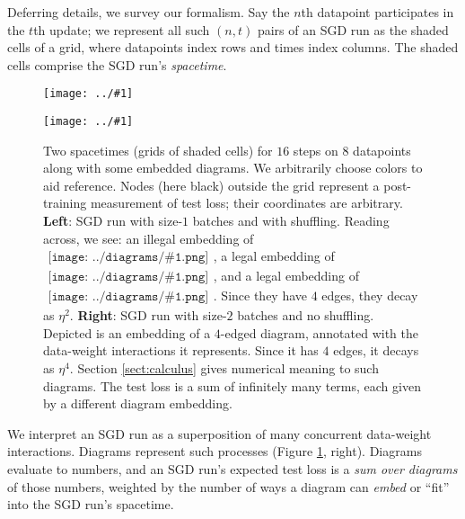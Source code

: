 \documentclass{article}
\theoremstyle{plain}
\theoremstyle{definition}
\newcommand{\plotmooh}[3]{
    \texttt{[image: ../\#1]}
}
\newcommand{\sdia}[1]{\begin{gathered}\texttt{[image: ../diagrams/\#1.png]}\end{gathered}}
\begin{document}
            Deferring details, we survey our formalism.  Say the $n$th
            datapoint participates in the $t$th update; we represent all such
            $(n, t)$ pairs of an SGD run as the shaded cells of a grid, where
            datapoints index rows and times index columns.  The shaded cells
            comprise the SGD run's \emph{spacetime}.
            \begin{figure}[H] 
                \centering  
                \plotmooh{diagrams/spacetime-e}{}{0.265\columnwidth}
                \plotmooh{diagrams/spacetime-f}{}{0.265\columnwidth}
                \caption{
                    Two spacetimes (grids of shaded cells) for $16$ steps
                    on $8$ datapoints along with some embedded
                    diagrams.  We arbitrarily choose colors to aid reference. 
                    Nodes (here black) outside the grid represent a
                    post-training measurement of test loss; their coordinates
                    are arbitrary.
                    {\bf Left}: SGD run with size-$1$ batches and with
                        shuffling.  
                        Reading across, we see:
                        an illegal embedding of
                        $\sdia{(01-2)(01-12)}$, a legal embedding of
                        $\sdia{(01-2)(01-12)}$, and a legal embedding of
                        $\sdia{(0-1-2)(01-12)}$.
                        Since they have $4$ edges, they decay as $\eta^2$.   
                    {\bf Right}: SGD run with size-$2$ batches and no
                        shuffling.  Depicted is an embedding of a $4$-edged
                        diagram, annotated with the data-weight interactions it
                        represents.
                        Since it has $4$ edges, it decays as $\eta^4$.   
                        Section \ref{sect:calculus} gives numerical meaning
                        to such diagrams.  The
                        test loss is a sum of infinitely many terms, each given
                        by a different diagram embedding.  
                }
                \label{fig:spacetimes}
            \end{figure}

            We interpret an SGD run as a superposition of many concurrent
            data-weight interactions.  Diagrams represent such
            processes (Figure \ref{fig:spacetimes}, right).  Diagrams evaluate
            to numbers, and an SGD run's expected test loss is a \emph{sum over
            diagrams} of those numbers, weighted by the number of ways a
            diagram can \emph{embed} or ``fit'' into the SGD run's spacetime.
\end{document}
